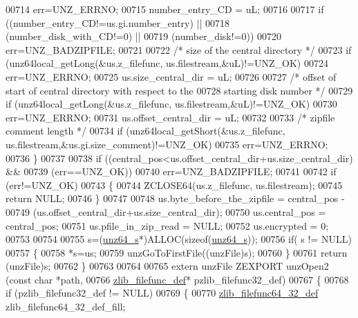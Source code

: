 \begin{DoxyCode}
00714             err=UNZ\_ERRNO;
00715         number\_entry\_CD = uL;
00716 
00717         \textcolor{keywordflow}{if} ((number\_entry\_CD!=us.gi.number\_entry) ||
00718             (number\_disk\_with\_CD!=0) ||
00719             (number\_disk!=0))
00720             err=UNZ\_BADZIPFILE;
00721 
00722         \textcolor{comment}{/* size of the central directory */}
00723         \textcolor{keywordflow}{if} (unz64local\_getLong(&us.z\_filefunc, us.filestream,&uL)!=UNZ\_OK)
00724             err=UNZ\_ERRNO;
00725         us.size\_central\_dir = uL;
00726 
00727         \textcolor{comment}{/* offset of start of central directory with respect to the}
00728 \textcolor{comment}{            starting disk number */}
00729         \textcolor{keywordflow}{if} (unz64local\_getLong(&us.z\_filefunc, us.filestream,&uL)!=UNZ\_OK)
00730             err=UNZ\_ERRNO;
00731         us.offset\_central\_dir = uL;
00732 
00733         \textcolor{comment}{/* zipfile comment length */}
00734         \textcolor{keywordflow}{if} (unz64local\_getShort(&us.z\_filefunc, us.filestream,&us.gi.size\_comment)!=UNZ\_OK)
00735             err=UNZ\_ERRNO;
00736     \}
00737 
00738     \textcolor{keywordflow}{if} ((central\_pos<us.offset\_central\_dir+us.size\_central\_dir) &&
00739         (err==UNZ\_OK))
00740         err=UNZ\_BADZIPFILE;
00741 
00742     \textcolor{keywordflow}{if} (err!=UNZ\_OK)
00743     \{
00744         ZCLOSE64(us.z\_filefunc, us.filestream);
00745         \textcolor{keywordflow}{return} NULL;
00746     \}
00747 
00748     us.byte\_before\_the\_zipfile = central\_pos -
00749                             (us.offset\_central\_dir+us.size\_central\_dir);
00750     us.central\_pos = central\_pos;
00751     us.pfile\_in\_zip\_read = NULL;
00752     us.encrypted = 0;
00753 
00754 
00755     s=(\hyperlink{structunz64__s}{unz64\_s}*)ALLOC(\textcolor{keyword}{sizeof}(\hyperlink{structunz64__s}{unz64\_s}));
00756     \textcolor{keywordflow}{if}( s != NULL)
00757     \{
00758         *s=us;
00759         unzGoToFirstFile((unzFile)s);
00760     \}
00761     \textcolor{keywordflow}{return} (unzFile)s;
00762 \}
00763 
00764 
00765 \textcolor{keyword}{extern} unzFile ZEXPORT unzOpen2 (\textcolor{keyword}{const} \textcolor{keywordtype}{char} *path,
00766                                         \hyperlink{structzlib__filefunc__def__s}{zlib\_filefunc\_def}* pzlib\_filefunc32\_def)
00767 \{
00768     \textcolor{keywordflow}{if} (pzlib\_filefunc32\_def != NULL)
00769     \{
00770         \hyperlink{structzlib__filefunc64__32__def__s}{zlib\_filefunc64\_32\_def} zlib\_filefunc64\_32\_def\_fill;

\end{DoxyCode}
